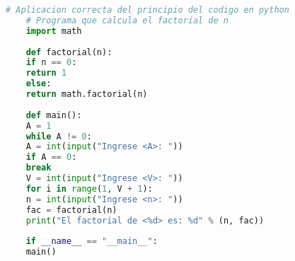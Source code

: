 \documentclass[a4,10pt]{article}
\begin{document}
\begin{lstlisting}[language=Python]
	# Aplicacion correcta del principio del codigo en python
	# Programa que calcula el factorial de n
	import math
	
	def factorial(n):
	if n == 0:
	return 1
	else:
	return math.factorial(n)
	
	def main():
	A = 1
	while A != 0:
	A = int(input("Ingrese <A>: "))
	if A == 0:
	break
	V = int(input("Ingrese <V>: "))
	for i in range(1, V + 1):
	n = int(input("Ingrese <n>: "))
	fac = factorial(n)
	print("El factorial de <%d> es: %d" % (n, fac))
	
	if __name__ == "__main__":
	main()
\end{lstlisting}

\printbibliography
\end{document}
